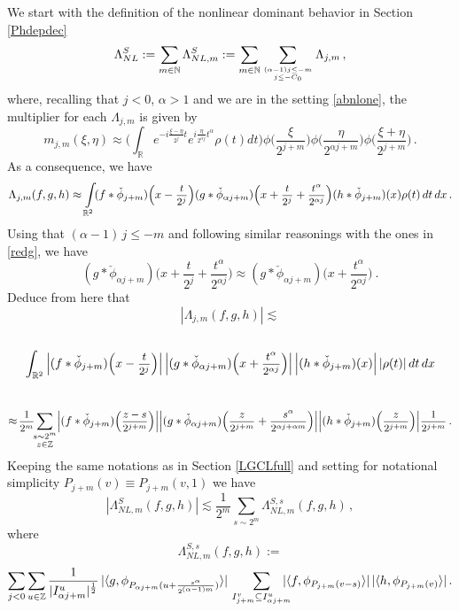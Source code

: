 \documentclass[a4paper,reqno]{amsart}
\numberwithin{equation}{section}
\theoremstyle{definition}
\newcommand{\R}{\mathbb{R}}
\newcommand{\Z}{\mathbb{Z}}
\newcommand{\N}{\mathbb{N}}
\newcommand{\sdfrac}[2]{\mbox{\small$\displaystyle\frac{#1}{#2}$}}
\def\a{\alpha}
\def\L{\Lambda}
\begin{document}
We start with the definition of the nonlinear dominant behavior in Section \ref{Phdepdec}
\begin{equation}\label{nlsl}
\L^{S}_{NL}:=\sum_{m\in\N} \L^{S}_{NL,m}:=\sum_{m\in\N}\sum_{{(\a-1) j\leq -m}\atop{j\leq -C_0}} \L_{j,m}\,,
\end{equation}
where, recalling that $j<0$, $\a>1$ and we are in the setting \eqref{abnlone}, the multiplier for each $\L_{j,m}$ is given by
\begin{equation}\label{nsaljmm}
m_{j,m}(\xi,\eta)\approx\bigg(\int_\R e^{-i\frac{\xi-\eta}{2^j}  t}e^{i\frac{\eta}{2^{\a j}}t^\a}\rho(t)dt\bigg)
\phi\Big(\frac{\xi}{2^{j+m}}\Big)\phi\Big(\frac{\eta}{2^{\a j+m}}\Big)\phi\Big(\frac{\xi+\eta}{2^{j+m}}\Big)\,.
\end{equation}
As a consequence, we have
\begin{equation}\label{nsaljm2}
\L_{j,m}(f,g,h)\approx\int\limits_{\R^2}\! (f*\check{\phi}_{j+m})\Big(x-\sdfrac{t}{2^j}\Big)
(g*\check{\phi}_{\a j+m})\Big(x+\sdfrac{t}{2^j}+\sdfrac{t^\a}{2^{\a j}}\Big) (h*\check{\phi}_{j+m})(x) \rho(t)\,dt\,dx\,.
\end{equation}
Using that $(\a-1)\,j\leq -m$ and following similar reasonings with the ones in \eqref{redg}, we have
\begin{equation}\label{redaln}
(g*\check{\phi}_{\a j+m})\bigg(x+\frac{t}{2^j}+\frac{t^\a}{2^{\a j}}\bigg)\approx
(g*\check{\phi}_{\a j+m})\bigg(x+\frac{t^\a}{2^{\a j}}\bigg)\:.
\end{equation}
Deduce from here that
\begin{equation}\label{saljm20n}
	|\L_{j,m}(f,g,h)|\lesssim
\end{equation}
\\[-4ex]
$$\int_{\R^2}  \Big|(f*\check{\phi}_{j+m})\Big(x-\sdfrac{t}{2^j}\Big)\Big|\,
\Big|(g*\check{\phi}_{\a j+m})\Big(x+\sdfrac{t^\a}{2^{\a j}}\Big)\Big|\,
\Big|(h*\check{\phi}_{j+m})(x)\Big|\,|\rho(t)|\,dt\,dx$$
\\[-3ex]
$$\approx\!\sdfrac{1}{2^m}\!\!\sum_{\substack{s\sim 2^m\\[.2ex] z\in\Z}}\! \Big|(f*\check{\phi}_{j+m})\Big(\sdfrac{z-s}{2^{j+m}}\Big)\Big|
\Big|(g*\check{\phi}_{\a j+m})\Big(\sdfrac{z}{2^{j+m}}+\sdfrac{s^{\a}}{2^{\a j+\a m}}\Big)\Big|
\Big|(h*\check{\phi}_{j+m})\Big(\sdfrac{z}{2^{j+m}}\Big)\Big|\sdfrac{1}{2^{j+m}}\,.$$
Keeping the same notations as in  Section \ref{LGCLfull} and setting for notational simplicity $P_{j+m}(v)\equiv P_{j+m}(v,1)$ we have
\begin{equation}\label{lnslre}
|\L^{S}_{NL,m}(f,g,h)|\lesssim \frac{1}{2^m}\sum_{s\sim 2^m} \L^{S,s}_{NL,m}(f,g,h)\,,
\end{equation}
where
\begin{equation}\label{lnslre1}
	\L^{S,s}_{NL,m}(f,g,h):=
\end{equation}
$$\sum_{j<0}\sum_{u\in\Z}
\frac{1}{|I_{\a j+m}^u|^{\frac{1}{2}}}\,|\langle g,  \phi_{P_{\a j+m}(u+\frac{s^{\a}}{2^{(\a-1) m}})}\rangle|\,\sum_{I_{j+m}^v\subseteq I_{\a j+ m}^u} \hspace{-.3cm}
|\langle f,  \phi_{P_{j+m}(v-s)}\rangle|\,|\langle h,  \phi_{P_{j+m}(v)}\rangle|\,.$$
\end{document}
